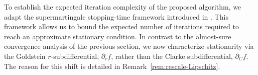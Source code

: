 \documentclass[11pt,a4paper]{article}
\newcommand{\R}{\mathbb{R}}
\newcommand{\N}{\ensuremath \mathbb{N}}
\newcommand{\F}{\mathcal{F}}
\newcommand{\Dexp}{p}
\newcommand{\goldelta}{r}
\newcommand{\sara}[1]{{\color{red}{\textbf{[SS: #1]}}\color{black}}}
\begin{document}
To establish the expected iteration complexity of the proposed algorithm, we adapt the supermartingale stopping-time framework introduced in \cite{MR4151319}. This framework allows us to bound the expected number of iterations required to reach an approximate stationary condition. In contrast to the almost-sure convergence analysis of the previous section, we now characterize stationarity via the Goldstein $\goldelta$-subdifferential, $\partial_\goldelta f$, rather than the Clarke subdifferential, $\partial_C f$. The reason for this shift is detailed in Remark~\ref{rem:rescale-Lipschitz}.
\end{document}
